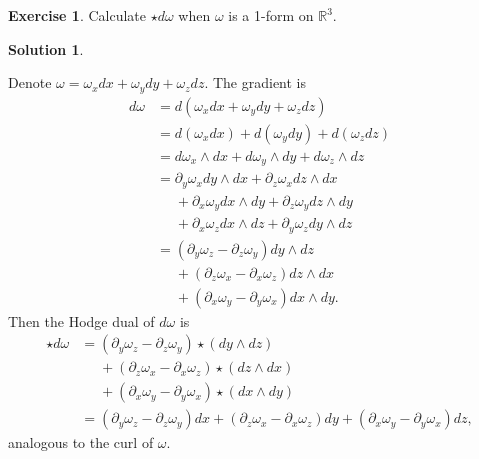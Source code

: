 \documentclass[11pt, a4paper]{article}
\theoremstyle{definition}
\newtheorem{ex}{Exercise}[part]
\newtheorem{sol}{Solution}[part]
\begin{document}
\begin{ex}

Calculate $\star d\omega$ when $\omega$ is a 1-form on $\mathbb{R}^3$.

\end{ex}

\begin{sol}\label{sol:curl1form}

Denote $\omega = \omega_x dx + \omega_y dy + \omega_z dz$. The gradient is
\begin{align*}
    d\omega &= d(\omega_x dx + \omega_y dy + \omega_z dz) \\
        &= d(\omega_x dx) + d(\omega_y dy) + d(\omega_z dz) \\
        &= d\omega_x \wedge dx + d\omega_y \wedge dy + d\omega_z \wedge dz \\
        &= \partial_y \omega_x dy \wedge dx + \partial_z \omega_x dz \wedge dx \\
        &\mathrel{\phantom{=}}{} + \partial_x \omega_y dx \wedge dy + \partial_z \omega_y dz \wedge dy \\
        &\mathrel{\phantom{=}}{} + \partial_x \omega_z dx \wedge dz + \partial_y \omega_z dy \wedge dz \\
        &= (\partial_y \omega_z - \partial_z \omega_y) dy \wedge dz \\
        &\mathrel{\phantom{=}}{} + (\partial_z \omega_x - \partial_x \omega_z) dz \wedge dx \\
        &\mathrel{\phantom{=}}{} +(\partial_x \omega_y - \partial_y \omega_x) dx \wedge dy.
\end{align*}
Then the Hodge dual of $d\omega$ is
\begin{align*}
    \star d\omega &= (\partial_y \omega_z - \partial_z \omega_y) \star (dy \wedge dz) \\
        &\mathrel{\phantom{=}}{} + (\partial_z \omega_x - \partial_x \omega_z) \star (dz \wedge dx) \\
        &\mathrel{\phantom{=}}{} +(\partial_x \omega_y - \partial_y \omega_x) \star (dx \wedge dy) \\
        &= \left(\partial_y \omega_z - \partial_z \omega_y\right) dx
            + \left(\partial_z \omega_x - \partial_x \omega_z\right) dy
            + \left(\partial_x \omega_y - \partial_y \omega_x\right) dz,
\end{align*}
analogous to the curl of $\omega$.

\end{sol}
\end{document}
